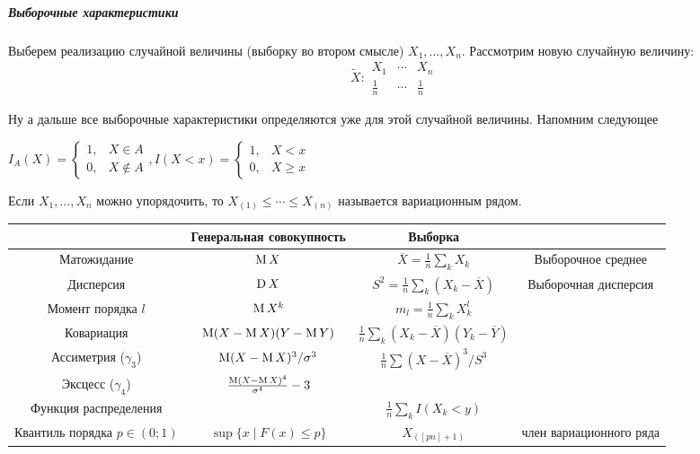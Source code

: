 \documentclass[12pt,timbord]{../../../notes}
\begin{document}
\subparagraph{Выборочные характеристики}
Выберем реализацию случайной величины (выборку во втором смысле) $X_1, \dotsc, X_n$.
Рассмотрим новую случайную величину:\[
  \widetilde{X} \colon 
  \begin{array}{c|c|c}
    X_1 & \cdots & X_n \\ \hline
    \frac{1}{n} & \cdots & \frac{1}{n}  
  \end{array}
\]

Ну а дальше все выборочные характеристики определяются уже для этой случайной величины.
Напомним следующее
\begin{defn}[Индикатор]\label{defn:stat::mom::ind}
  $\displaystyle I_A(X) = \begin{cases}
    1, &X\in A\\
    0, & X \not\in A
  \end{cases}, 
  I(X < x) = \begin{cases}
    1, &X < x\\
    0, & X \geqslant x
  \end{cases}
  $
\end{defn}
\begin{defn}\label{defn:stat::mom::varser}
  Если $X_1, \dotsc, X_n$ можно упорядочить, то $X_{(1)} \leqslant \cdots \leqslant X_{(n)}$
  называется вариационным рядом.
\end{defn}
{\def\arraystretch{1.5}
\begin{table}[h] \underdev
  \begin{tabular}{|c|c|c|c|}
    \hline
    & \bf Генеральная совокупность & \bf Выборка &  \\ \hline
    Матожидание & $\operatorname{\mathrm M} X$ & $\overline{X} = \frac{1}{n} \sum_k X_k$ & Выборочное среднее\\
    Дисперсия & $\operatorname{\mathrm D} X$ & $S^2 = \frac{1}{n} \sum_k (X_k - \overline X)$ & Выборочная дисперсия\\
    Момент порядка $l$ & $\operatorname{\mathrm M} X^k$ & $m_l = \frac{1}{n} \sum_k X_k^l$ & \\

    Ковариация & $\operatorname{\mathrm M} (X-\operatorname{\mathrm M} X) (Y-\operatorname{\mathrm M} Y)$ & $\frac{1}{n} \sum_k (X_k - \overline X) (Y_k -
    \overline Y)$ & \\
    Ассиметрия ($\gamma_3$) & $\operatorname{\mathrm M} (X- \operatorname{\mathrm M} X)^3/\sigma^3$  
                                      & $\frac 1 n \sum (X- \overline X)^3/S^3$ & \\
    Эксцесс ($\gamma_4$) & $\frac{\operatorname{\mathrm M} (X - \operatorname{\mathrm M} X)^4}{\sigma^4} - 3 $& & \\
    Функция распределения & & $\frac 1 n \sum_k I(X_k < y)$ & \\
    Квантиль порядка $p\in(0;1)$ & $\sup \{x \mid F(x) \leqslant p \}$ & $X_{([pn]+1)}$ 
                                                & член вариационного ряда\\
    \hline
  \end{tabular}
\end{table}}
\end{document}
